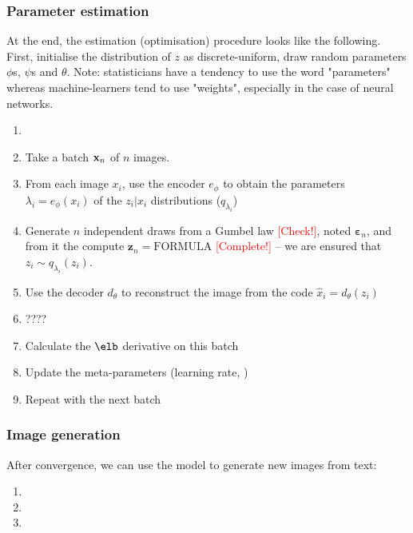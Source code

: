 \documentclass{article}
\begin{document}
\begin{appendix}
\subsubsection{Parameter estimation}

At the end, the estimation (optimisation) procedure looks like the following. First, initialise the distribution of $z$ as discrete-uniform, draw random parameters $\phi$s,  $\psi$s and $\theta$. Note: statisticians have a tendency to use the word "parameters" whereas machine-learners tend to use "weights", especially in the case of neural networks.

\newcommand{\zn}{\mathbf{z}_n}

\begin{enumerate}
    \item 
    \item Take a batch $\mathbf{x}_n$ of $n$ images.
    \item From each image $x_i$, use the encoder $e_\phi$ to obtain the parameters $\lambda_i=e_\phi(x_i)$ of the $z_i|x_i$ distributions ($q_{\lambda_i}$)
    \item Generate $n$ independent draws from a Gumbel law \textcolor{red}{[Check!]}, noted $\boldsymbol{\varepsilon}_n$, and from it the compute $\zn= \textrm{FORMULA}$ \textcolor{red}{[Complete!]} – we are ensured that $z_i\sim q_{\lambda_i}(z_i)$.
    \item Use the decoder $d_\theta$ to reconstruct the image from the code $\hat{x}_i = d_{\theta}(z_i)$
    \item ????
    \item Calculate the $\elb$ derivative on this batch
    \item Update the meta-parameters (learning rate, )
    \item Repeat with the next batch
\end{enumerate}

\subsubsection{Image generation}

After convergence, we can use the model to generate new images from text:

\begin{enumerate}
    \item
    \item
    \item
\end{enumerate}


\end{appendix}
\end{document}
